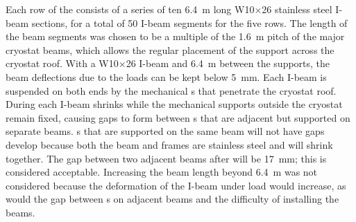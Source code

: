 Each row of the  consists of a series of ten  \SI{6.4}{m} long
W10$\times$26 stainless steel I-beam sections, for a total of \num{50} I-beam segments for the five rows. The length of the beam segments was chosen to be a multiple of the \SI{1.6}{m} pitch of the major cryostat beams, which allows the regular placement of the support \fdth across the cryostat roof. With a W10$\times$26 I-beam and \SI{6.4}{m} between the supports,  the beam deflections due to the loads can be kept below \SI{5}{mm}. 
Each I-beam is suspended on both ends by the mechanical \fdth{}s that penetrate the cryostat roof. 
During \cooldown  each I-beam shrinks while the mechanical supports outside the cryostat remain fixed,  causing gaps to form between s that are adjacent but supported on separate beams.
s that are supported on the same beam will not have gaps develop because both the beam and  frames are stainless steel and will shrink together.
The gap between two adjacent  beams after \cooldown will be \SI{17}{mm}; this is considered acceptable. 
Increasing the beam length beyond \SI{6.4}{m} was not considered because the deformation of the I-beam under load would increase, as would the gap between s on adjacent beams and the difficulty of installing the beams. 



